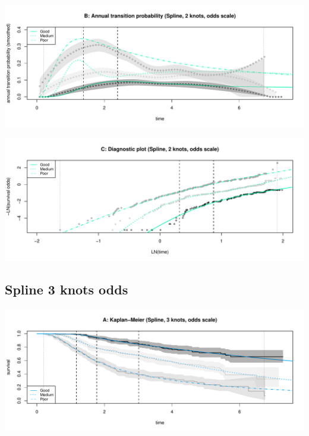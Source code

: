 \documentclass[
]{article}
\begin{document}
\begin{flushleft}\includegraphics[height=0.25\textheight]{Images/spline_odds2-2} \end{flushleft}

\begin{flushleft}\includegraphics[height=0.25\textheight]{Images/spline_odds2-3} \end{flushleft}

\clearpage

\hypertarget{spline-3-knots-odds}{%
\subsection{Spline 3 knots odds}\label{spline-3-knots-odds}}

\begin{flushleft}\includegraphics[height=0.25\textheight]{Images/spline_odds3-1} \end{flushleft}
\end{document}
